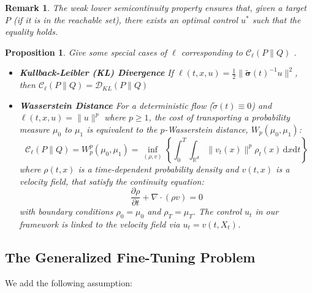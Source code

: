 \documentclass[11pt]{article}
\newtheorem{proposition}{Proposition}[section]
\newtheorem{remark}{Remark}[section]
\def\w{\widetilde}
\begin{document}
\begin{remark}
The weak lower semicontinuity property ensures that, given a target $P$ (if it is in the reachable set), there exists an optimal control $u^*$ such that the equality holds.    
\end{remark}

\begin{proposition}
Give some special cases of $\ell$ corresponding to $\mathcal C_\ell(P\|Q)$ .
\begin{itemize}
\item[\bf 1.] \textbf{Kullback-Leibler (KL) Divergence} 
If $\ell(t, x, u) = \frac{1}{2} \| \mathbf{\w\sigma}(t)^{-1} u \|^2$, then $\mathcal C_\ell(P\|Q) = \mathcal D_{KL}(P\|Q)$
\item[\bf 2.] \textbf{Wasserstein Distance} 
For a deterministic flow ($\w\sigma(t) \equiv 0$) and $\ell(t,x,u)=\|u\|^p$ where $p \ge 1$, the cost of transporting a probability measure $\mu_0$ to $\mu_1$ is equivalent to the $p$-Wasserstein distance, $W_p(\mu_0, \mu_1)$:
$$
\mathcal{C}_\ell(P \| Q) = W_p^p(\mu_0, \mu_1) = \inf_{(\rho,v)} \left\{ \int_0^T \int_{\mathbb{R}^d} \|v_t(x)\|^p \rho_t(x) \, \mathrm{d}x \mathrm{d}t \right\}
$$
where $\rho(t, x)$ is a time-dependent probability density and $v(t, x)$ is a velocity field, that satisfy the continuity equation:
$$
\frac{\partial \rho}{\partial t} + \nabla \cdot (\rho v) = 0
$$
with boundary conditions $\rho_0 = \mu_0$ and $\rho_T = \mu_T$. The control $u_t$ in our framework is linked to the velocity field via $u_t = v(t, X_t)$.
\end{itemize}
\end{proposition}



\subsection{The Generalized Fine-Tuning Problem }
We add the following assumption:
\end{document}
